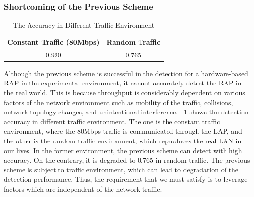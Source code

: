 \documentclass[conference]{IEEEtran}
\begin{document}
\subsubsection{Shortcoming of the Previous Scheme}\label{sec:shortcoming}
\begin{table}[t] 
    \begin{center}
        \caption{The Accuracy in Different Traffic Environment}
        \label{tab:thrput result}
        \begin{tabular}{c c} \hline
            Constant Traffic (80Mbps) & Random Traffic \\ \hline \hline
            0.920 & 0.765 \\ \hline
        \end{tabular}
    \end{center}
    \vspace{-2zh}
\end{table}
Although the previous scheme is successful in the detection for a hardware-based RAP in the experimental environment, it cannot accurately detect the RAP in the real world.
This is because throughput is considerably dependent on various factors of the network environment such as mobility of the traffic, collisions, network topology changes, and unintentional interference.
\tablename~\ref{tab:thrput result} shows the detection accuracy in different traffic environment.
The one is the constant traffic environment, where the 80Mbps traffic is communicated through the LAP, and the other is the random traffic environment, which reproduces the real LAN in our lives.
In the former environment, the previous scheme can detect with high accuracy.
On the contrary, it is degraded to 0.765 in random traffic.
The previous scheme is subject to traffic environment, which can lead to degradation of the detection performance.
Thus, the requirement that we must satisfy is to leverage factors which are independent of the network traffic.
\end{document}
